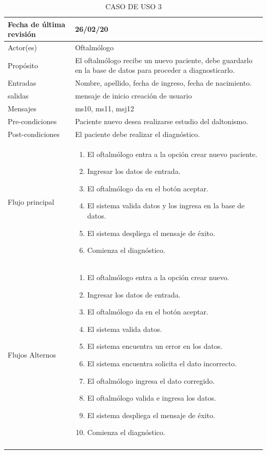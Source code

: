\documentclass[10pt]{article}
\begin{document}
\begin{longtable}{|p{3.8cm}|p{10.8cm}|}
\hline
Fecha de última revisión & 26/02/20\\
\hline
Actor(es) & Oftalmólogo \\
\hline
Propósito & El oftalmólogo recibe un nuevo paciente, debe guardarlo en la base de datos para proceder a diagnosticarlo. \\
\hline
Entradas & Nombre, apellido, fecha de ingreso, fecha de nacimiento.\\
\hline
salidas & mensaje de inicio creación de usuario\\
\hline
Mensajes & ms10, ms11, msj12\\
\hline
Pre-condiciones & Paciente nuevo desea realizarse estudio del daltonismo.\\
\hline
Post-condiciones & El paciente debe realizar el diagnóstico.\\
\hline
Flujo principal & \begin{enumerate}
    \item El oftalmólogo entra a la opción crear nuevo paciente.
    \item Ingresar los datos de entrada.
    \item El oftalmólogo da en el botón aceptar.
    \item El sistema valida datos y los ingresa en la base de datos.
    \item El sistema despliega el mensaje de éxito.
    \item Comienza el diagnóstico. 
\end{enumerate}
    \\
\hline
Flujos Alternos &  \begin{enumerate}
    \item El oftalmólogo entra a la opción crear nuevo.
    \item Ingresar los datos de entrada.
    \item El oftalmólogo da en el botón aceptar.
    \item El sistema valida datos.
    \item El sistema encuentra un error en los datos.
    \item El sistema encuentra solicita el dato incorrecto.
    \item El oftalmólogo ingresa el dato corregido.
    \item El oftalmólogo valida e ingresa los datos.
    \item El sistema despliega el mensaje de éxito.
    \item Comienza el diagnóstico.
\end{enumerate}\\
\hline
\caption{CASO DE USO 3}
\label{tabla1}
\end{longtable}
\end{document}

